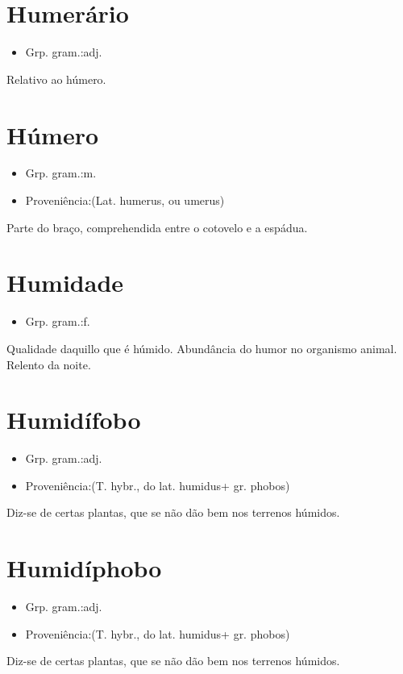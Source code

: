 \documentclass{article}
\begin{document}
\section{Humerário}
\begin{itemize}
\item {Grp. gram.:adj.}
\end{itemize}
Relativo ao húmero.
\section{Húmero}
\begin{itemize}
\item {Grp. gram.:m.}
\end{itemize}
\begin{itemize}
\item {Proveniência:(Lat. \textunderscore humerus\textunderscore , ou \textunderscore umerus\textunderscore )}
\end{itemize}
Parte do braço, comprehendida entre o cotovelo e a espádua.
\section{Humidade}
\begin{itemize}
\item {Grp. gram.:f.}
\end{itemize}
Qualidade daquillo que é húmido.
Abundância do humor no organismo animal.
Relento da noite.
\section{Humidífobo}
\begin{itemize}
\item {Grp. gram.:adj.}
\end{itemize}
\begin{itemize}
\item {Proveniência:(T. hybr., do lat. \textunderscore humidus\textunderscore  + gr. \textunderscore phobos\textunderscore )}
\end{itemize}
Diz-se de certas plantas, que se não dão bem nos terrenos húmidos.
\section{Humidíphobo}
\begin{itemize}
\item {Grp. gram.:adj.}
\end{itemize}
\begin{itemize}
\item {Proveniência:(T. hybr., do lat. \textunderscore humidus\textunderscore  + gr. \textunderscore phobos\textunderscore )}
\end{itemize}
Diz-se de certas plantas, que se não dão bem nos terrenos húmidos.
\end{document}
